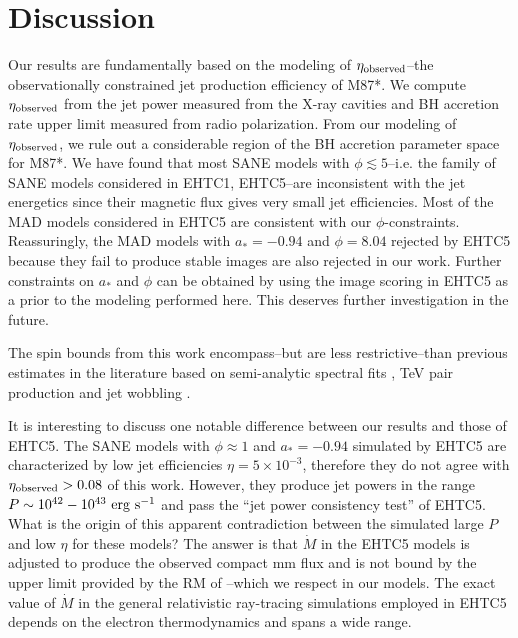 \documentclass[twocolumn]{aastex62} %
\begin{document}
\section{Discussion} \label{sec:disc}

Our results are fundamentally based on the modeling of $\eta_{\rm observed}$--the observationally constrained jet production efficiency of M87*. We compute $\eta_{\rm observed}$ from the jet power measured from the X-ray cavities and BH accretion rate upper limit measured from radio polarization. From our modeling of $\eta_{\rm observed}$, we rule out a considerable region of the BH accretion parameter space for M87*. We have found that most SANE models with $\phi \lesssim 5$--i.e. the family of SANE models considered in EHTC1, EHTC5--are inconsistent with the jet energetics since their magnetic flux gives very small jet efficiencies. Most of the MAD models considered in EHTC5 are consistent with our $\phi$-constraints.
Reassuringly, the MAD models with $a_*=-0.94$ and $\phi=8.04$ rejected by EHTC5 because they fail to produce stable images are also rejected in our work. Further constraints on $a_*$ and $\phi$ can be obtained by using the image scoring in EHTC5 as a prior to the modeling performed here. This deserves further investigation in the future. 

The spin bounds from this work encompass--but are less restrictive--than previous estimates in the literature based on semi-analytic spectral fits \citep{Feng2017}, TeV pair production \citep{Li2009} and jet wobbling \citep{Sobyanin2018}. 

It is interesting to discuss one notable difference between our results and those of EHTC5. The SANE models with $\phi \approx 1$ and $a_*=-0.94$ simulated by EHTC5 are characterized by low jet efficiencies $\eta = 5 \times 10^{-3}$, therefore they do not agree with $\eta_{\rm observed} > 0.08$ of this work. However, they produce jet powers in the range $P \sim 10^{42}-10^{43} \ {\rm erg \ s}^{-1}$ and pass the ``jet power consistency test'' of EHTC5. What is the origin of this apparent contradiction between the simulated large $P$ and low $\eta$ for these models? 
The answer is that $\dot{M}$ in the EHTC5 models is adjusted to produce the observed compact mm flux and is not bound by the upper limit provided by the RM of \cite{Kuo2014}--which we respect in our models. The exact value of $\dot{M}$ in the general relativistic ray-tracing simulations employed in EHTC5 depends on the electron thermodynamics and spans a wide range.
\end{document}
